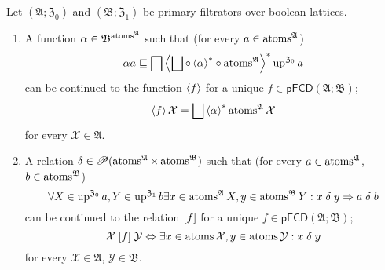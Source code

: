 \begin{thm}
\label{pf-atom-cont}Let $(\mathfrak{A};\mathfrak{Z}_{0})$ and $(\mathfrak{B};\mathfrak{Z}_{1})$
be primary filtrators over boolean lattices.
\begin{enumerate}
\item \label{pf-at-f}A function $\alpha\in\mathfrak{B}^{\operatorname{atoms}^{\mathfrak{A}}}$
such that (for every $a\in\operatorname{atoms}^{\mathfrak{A}}$)
\begin{equation}
\alpha a\sqsubseteq\bigsqcap\left\langle \bigsqcup\circ\left\langle \alpha\right\rangle ^{\ast}\circ\operatorname{atoms}^{\mathfrak{A}}\right\rangle ^{\ast}\operatorname{up}^{\mathfrak{Z}_{0}}a\label{pf-alpha-a-greater}
\end{equation}
can be continued to the function $\left\langle f\right\rangle$ for a unique $f\in\mathsf{pFCD}(\mathfrak{A};\mathfrak{B})$;
\begin{equation}
\left\langle f\right\rangle\mathcal{X}=\bigsqcup\left\langle \alpha\right\rangle ^{\ast}\operatorname{atoms}^{\mathfrak{A}}\mathcal{X}\label{pf-atoms-fun-cont}
\end{equation}
for every $\mathcal{X}\in\mathfrak{A}$.
\item \label{pf-at-r}A relation $\delta\in\mathscr{P}(\operatorname{atoms}^{\mathfrak{A}}\times\operatorname{atoms}^{\mathfrak{B}})$
such that (for every $a\in\operatorname{atoms}^{\mathfrak{A}}$, $b\in\operatorname{atoms}^{\mathfrak{B}}$)
\begin{equation}
\forall X\in\operatorname{up}^{\mathfrak{Z}_{0}}a,Y\in\operatorname{up}^{\mathfrak{Z}_{1}}b\exists x\in\operatorname{atoms}^{\mathfrak{A}}X,y\in\operatorname{atoms}^{\mathfrak{B}}Y:x\mathrel{\delta}y\Rightarrow a\mathrel{\delta}b\label{pf-atoms-delta}
\end{equation}
can be continued to the relation $\mathrel{\left[f\right]}$ for a unique $f\in\mathsf{pFCD}(\mathfrak{A};\mathfrak{B})$;
\begin{equation}
\mathcal{X}\mathrel{\left[f\right]}\mathcal{Y}\Leftrightarrow\exists x\in\operatorname{atoms}\mathcal{X},y\in\operatorname{atoms}\mathcal{Y}:x\mathrel{\delta}y\label{pf-atoms-rel-cont}
\end{equation}
for every $\mathcal{X}\in\mathfrak{A}$, $\mathcal{Y}\in\mathfrak{B}$.
\end{enumerate}
\end{thm}
